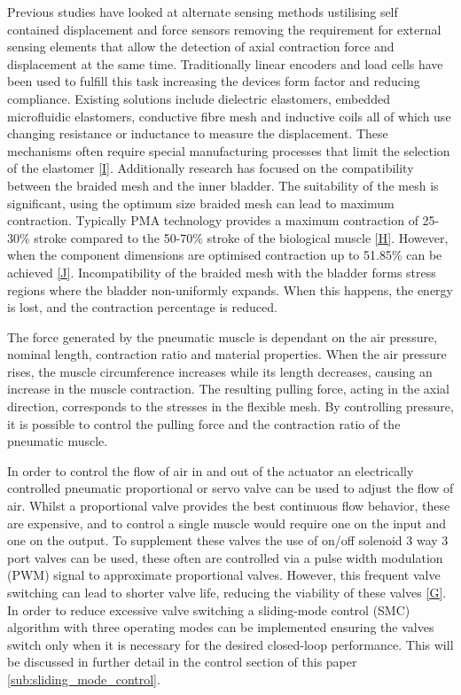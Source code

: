 \documentclass[11pt,a4paper]{article}
\begin{document}
Previous studies have looked at alternate sensing methods ustilising self contained displacement and force sensors removing the requirement for external sensing elements that allow the detection of axial contraction force and displacement at the same time. Traditionally linear encoders and load cells have been used to fulfill this task increasing the devices form factor and reducing compliance. Existing solutions include dielectric elastomers, embedded microfluidic elastomers, conductive fibre mesh and inductive coils all of which use changing resistance or inductance to measure the displacement. These mechanisms often require special manufacturing processes that limit the selection of the elastomer \ref{I}. 
Additionally research has focused on the compatibility between the braided mesh and the inner bladder. The suitability of the mesh is significant, using the optimum size braided mesh can lead to maximum contraction. Typically PMA technology provides a maximum contraction of 25-30\% stroke compared to the 50-70\% stroke of the biological muscle \ref{H}. However, when the component dimensions are optimised contraction up to 51.85\% can be achieved \ref{J}. Incompatibility of the braided mesh with the bladder forms stress regions where the bladder non-uniformly expands. When this happens, the energy is lost, and the contraction percentage is reduced. \newline

The force generated by the pneumatic muscle is dependant on the air pressure, nominal length, contraction ratio and material properties. When the air pressure rises, the muscle circumference increases while its length decreases, causing an increase in the muscle contraction. The resulting pulling force, acting in the axial direction, corresponds to the stresses in the flexible mesh. By controlling pressure, it is possible to control the pulling force and the contraction ratio of the pneumatic muscle. \newline

In order to control the flow of air in and out of the actuator an electrically controlled pneumatic proportional or servo valve can be used to adjust the flow of air. Whilst a proportional valve provides the best continuous flow behavior, these are expensive, and to control a single muscle would require one on the input and one on the output. To supplement these valves the use of on/off solenoid 3 way 3 port valves can be used, these often are controlled via a pulse width modulation (PWM) signal to approximate proportional valves. However, this frequent valve switching can lead to shorter valve life, reducing the viability of these valves \ref{G}. In order to reduce excessive valve switching a sliding-mode control (SMC) algorithm with three operating modes can be implemented ensuring the valves switch only when it is necessary for the desired closed-loop performance. This will be discussed in further detail in the control section of this paper \ref{sub:sliding_mode_control}. \newline
\end{document}
